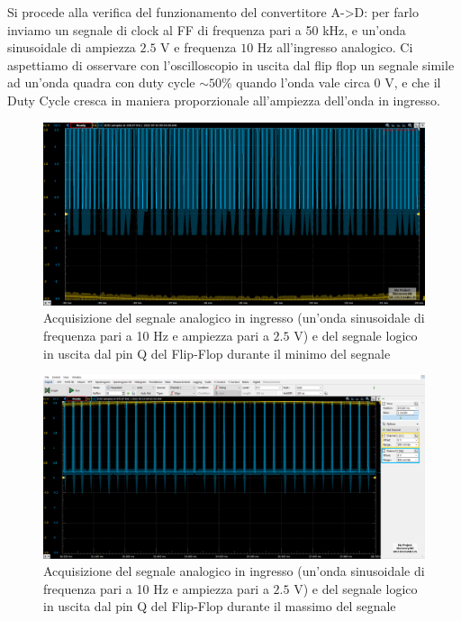 \documentclass[10pt, a4paper, italian]{article}
\begin{document}
Si procede alla verifica del funzionamento del convertitore A->D: per farlo
inviamo un segnale di clock al FF di frequenza pari a 50 kHz, e un'onda
sinusoidale di ampiezza $2.5$ V e frequenza $10$ Hz all'ingresso analogico.
Ci aspettiamo di osservare con l'oscilloscopio in uscita dal flip flop un
segnale simile ad un'onda quadra con duty cycle $\sim 50 \percent$ quando
l'onda vale circa 0 V, e che il Duty Cycle cresca in maniera proporzionale
all'ampiezza dell'onda in ingresso.
\begin{figure}[htbp]
    \centering
	\includegraphics[width=\textwidth]{BOTTOM}
    \caption{Acquisizione del segnale analogico in ingresso (un'onda sinusoidale di frequenza pari a 10 Hz e ampiezza pari a $2.5$ V) e del segnale logico in uscita dal pin Q del Flip-Flop durante il minimo del segnale
    \label{fig: bot}}
\end{figure}
\begin{figure}[htbp]
    \centering
	\includegraphics[width=\textwidth]{TOP}
    \caption{Acquisizione del segnale analogico in ingresso (un'onda sinusoidale di frequenza pari a 10 Hz e ampiezza pari a $2.5$ V) e del segnale logico in uscita dal pin Q del Flip-Flop durante il massimo del segnale
    \label{fig: top}}
\end{figure}
\end{document}
